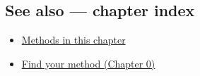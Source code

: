 \documentclass[
]{article}
\newenvironment{Shaded}{\begin{snugshade}}{\end{snugshade}}
\providecommand{\tightlist}{%
  \setlength{\itemsep}{0pt}\setlength{\parskip}{0pt}}
\begin{document}
\begin{Shaded}
\begin{Highlighting}[]

\end{Highlighting}
\end{Shaded}

\subsection{See also --- chapter index}\label{see-also-chapter-index}

\begin{itemize}
\tightlist
\item
  \href{../index.Rmd}{Methods in this chapter}
\item
  \href{../../../ch00-find-your-method.Rmd}{Find your method (Chapter
  0)}
\end{itemize}
\end{document}
